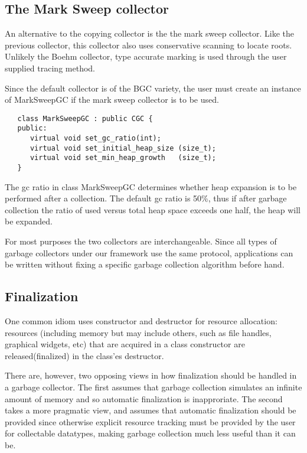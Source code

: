 \subsection{The Mark Sweep collector}

   An alternative to the copying collector is the the mark sweep collector.
Like the previous collector, this collector also uses conservative scanning 
to locate roots.  Unlikely the Boehm collector, type accurate marking
is used through the user supplied tracing method.

   Since the default collector is of the {\sf BGC} variety, the user must
create an instance of {\sf MarkSweepGC} if the mark sweep collector
is to be used.  

\begin{verbatim}
   class MarkSweepGC : public CGC {
   public:
      virtual void set_gc_ratio(int);
      virtual void set_initial_heap_size (size_t);
      virtual void set_min_heap_growth   (size_t);
   }
\end{verbatim}

   The gc ratio in class {\sf MarkSweepGC} determines whether heap
expansion is to be performed after a collection.  The default gc ratio
is 50\%, thus if after garbage collection the ratio of used versus total
heap space exceeds one half, the heap will be expanded. 

   For most purposes the two collectors are interchangeable.  Since
all types of garbage collectors under our framework use the same protocol, 
applications can be written without fixing a specific garbage collection
algorithm before hand.  

\subsection{Finalization} 

   One common \CPP{} idiom uses constructor and destructor for
resource allocation: resources (including memory but may include others,
such as file handles, graphical widgets, etc) that are acquired
in a class constructor are released(finalized) in the class'es destructor.

   There are, however, two opposing views in how finalization should be handled
in a garbage collector.  The first assumes that garbage collection
simulates an infinite amount of memory and so automatic finalization is
inapproriate.   The second takes a more pragmatic view, and assumes that
automatic finalization should be provided since otherwise explicit resource
tracking must be provided by the user for collectable datatypes, making garbage 
collection much less useful than it can be.

